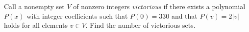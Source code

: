 Call a nonempty set $V$ of nonzero integers \emph{victorious} if there exists a polynomial $P(x)$ with integer coefficients such that $P(0)=330$ and that $P(v)=2|v|$ holds for all elements $v\in V$. Find the number of victorious sets.
